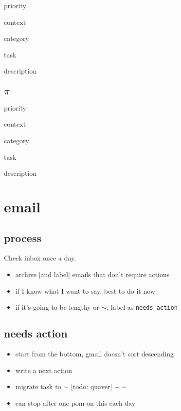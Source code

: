 \documentclass[]{book}
\providecommand{\tightlist}{%
  \setlength{\itemsep}{0pt}\setlength{\parskip}{0pt}}
\begin{document}
priority

context

category

task

description

\hypertarget{pi}{%
\subsection{\texorpdfstring{\(\pi\)}{\textbackslash{}pi}}\label{pi}}

priority

context

category

task

description

\hypertarget{email}{%
\section{email}\label{email}}

\hypertarget{process}{%
\subsection{process}\label{process}}

Check inbox once a day.

\begin{itemize}
\tightlist
\item
  archive {[}and label{]} emails that don't require actions
\item
  if I know what I want to say, best to do it now
\item
  if it's going to be lengthy or \(\sim\), label as \texttt{needs\ action}
\end{itemize}

\hypertarget{needs-action}{%
\subsection{needs action}\label{needs-action}}

\begin{itemize}
\tightlist
\item
  start from the bottom, gmail doesn't sort descending
\item
  write a next action
\item
  migrate task to \(\sim\) {[}todo: quaver{]} \(+ \sim\)
\item
  can stop after one pom on this each day
\end{itemize}
\end{document}
